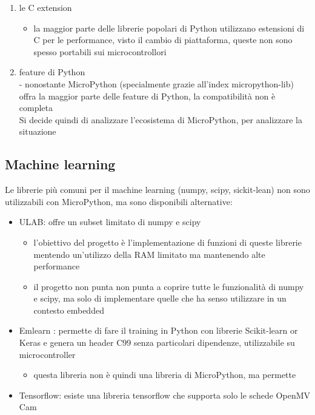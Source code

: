 \documentclass[12pt,a4paper]{report}
\begin{document}
\begin{enumerate}
\item
  le C extension

  \begin{itemize}
    \item
    la maggior parte delle librerie popolari di Python utilizzano
    estensioni di C per le performance, visto il cambio di piattaforma,
    queste non sono spesso portabili sui microcontrollori
  \end{itemize}
\item
  feature di Python\\
  - nonostante MicroPython (specialmente grazie
  all'index micropython-lib) offra la maggior parte
  delle feature di Python, la compatibilità non è completa\\
  Si decide quindi di analizzare l'ecosistema di
  MicroPython, per analizzare la situazione
\end{enumerate}

\subsection{Machine learning}\label{machine-learning}

Le librerie più comuni per il machine learning (numpy, scipy,
sickit-lean) non sono utilizzabili con MicroPython, ma sono disponibili
alternative:

\begin{itemize}
\item
  {ULAB}\cite{ulab}:
  offre un subset limitato di numpy e scipy

  \begin{itemize}
    \item
    l'obiettivo del progetto è
    l'implementazione di funzioni di queste librerie
    mentendo un'utilizzo della RAM limitato ma
    mantenendo alte performance
  \item
    il progetto non punta non punta a coprire tutte le funzionalità di
    numpy e scipy, ma solo di implementare quelle che ha senso
    utilizzare in un contesto embedded
  \end{itemize}
\item
  Emlearn \cite{emlearn}: permette di fare
  il training in Python con librerie Scikit-learn or Keras e genera un
  header C99 senza particolari dipendenze, utilizzabile su
  microcontroller

  \begin{itemize}
    \item
    questa libreria non è quindi una libreria di MicroPython, ma
    permette
  \end{itemize}
\item
  Tensorflow\cite{openmv_tensor}: esiste
  una libreria tensorflow che supporta solo le schede OpenMV Cam
\end{itemize}
\end{document}

